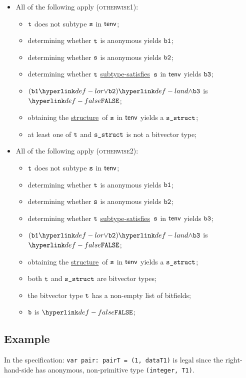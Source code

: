 \documentclass{book}
\newcommand\ProseOrTypeError[0]{\ProseTerminateAs{\TypeErrorConfig}}
\newcommand\structure[0]{\hyperlink{def-structure}{structure}}
\newcommand\subtypesatisfies[0]{\hyperlink{def-subtypesatisfies}{subtype-satisfies}}
\begin{document}
\begin{itemize}
  \item All of the following apply (\textsc{otherwise1}):
  \begin{itemize}
    \item $\texttt{t}$ does not subtype $\texttt{s}$ in $\textsf{tenv}$;
    \item determining whether $\texttt{t}$ is anonymous yields $\texttt{b1}$;
    \item determining whether $\texttt{s}$ is anonymous yields $\texttt{b2}$;
    \item determining whether $\texttt{t}$ \subtypesatisfies\ $\texttt{s}$ in $\textsf{tenv}$ yields $\texttt{b3}$;
    \item $(\vbone \lor \vbtwo) \land \vbthree$ is $\False$;
    \item obtaining the \structure\ of $\texttt{s}$ in $\textsf{tenv}$ yields a $\texttt{s\_struct}$\ProseOrTypeError;
    \item at least one of $\texttt{t}$ and $\texttt{s\_struct}$ is not a bitvector type;
  \end{itemize}

  \item All of the following apply (\textsc{otherwise2}):
  \begin{itemize}
    \item $\texttt{t}$ does not subtype $\texttt{s}$ in $\textsf{tenv}$;
    \item determining whether $\texttt{t}$ is anonymous yields $\texttt{b1}$;
    \item determining whether $\texttt{s}$ is anonymous yields $\texttt{b2}$;
    \item determining whether $\texttt{t}$ \subtypesatisfies\ $\texttt{s}$ in $\textsf{tenv}$ yields $\texttt{b3}$;
    \item $(\vbone \lor \vbtwo) \land \vbthree$ is $\False$;
    \item obtaining the \structure\ of $\texttt{s}$ in $\textsf{tenv}$ yields a $\texttt{s\_struct}$\ProseOrTypeError;
    \item both $\texttt{t}$ and $\texttt{s\_struct}$ are bitvector types;
    \item the bitvector type $\texttt{t}$ has a non-empty list of bitfields;
    \item $\texttt{b}$ is $\False$;
  \end{itemize}
\end{itemize}

\subsection{Example}
In the specification:
\texttt{var pair: pairT = (1, dataT1)} is legal since the right-hand-side has
anonymous, non-primitive type \texttt{(integer, T1)}.
\end{document}

